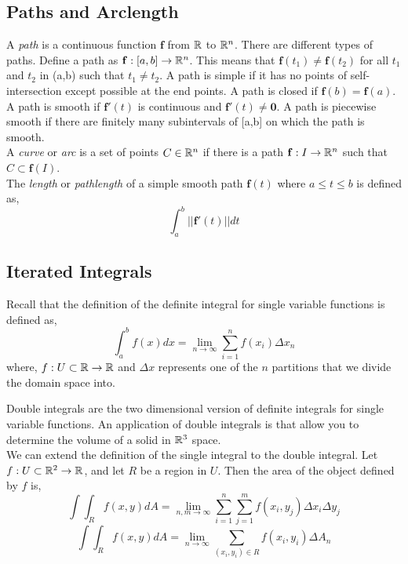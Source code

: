 \documentclass[12pt]{article}
\begin{document}
\subsection{Paths and Arclength}
 A \emph{path} is a continuous function $\mathbf{f}$ from $\mathbb{R}$ to $\mathbb{R}^n$. There are different types of paths. Define a path as $\mathbf{f}:[a,b]\rightarrow\mathbb{R}^n$. This means that $\mathbf{f}(t_1)\neq\mathbf{f}(t_2)$ for all $t_1$ and $t_2$ in (a,b) such that $t_1\neq t_2$. A path is simple if it has no points of self-intersection except possible at the end points. A path is closed if $\mathbf{f}(b)=\mathbf{f}(a)$. A path is smooth if $\mathbf{f}'(t)$ is continuous and $\mathbf{f}'(t)\neq\mathbf{0}$. A path is piecewise smooth if there are finitely many subintervals of [a,b] on which the path is smooth. \\

 A \emph{curve} or \emph{arc} is a set of points $C\in\mathbb{R}^n$ if there is a path $\mathbf{f}:I\rightarrow\mathbb{R}^n$ such that $C\subset\mathbf{f}(I)$. \\

 The \emph{length} or \emph{pathlength} of a simple smooth path $\mathbf{f}(t)$ where $a\leq t \leq b$ is defined as,
\[
\int_a^b || \mathbf{f}'(t) || dt
\]

\subsection{Iterated Integrals}

Recall that the definition of the definite integral for single variable functions is defined as,
\[
\int_a^b f(x) dx = \lim_{n\rightarrow\infty}\sum_{i=1}^n f(x_i)\Delta x_n
\]
where, $f:U\subset\mathbb{R}\rightarrow\mathbb{R}$ and $\Delta x$ represents one of the $n$ partitions that we divide the domain space into. 

 Double integrals are the two dimensional version of definite integrals for single variable functions. An application of double integrals is that allow you to determine the volume of a solid in $\mathbb{R}^3$ space.\\

 We can extend the definition of the single integral to the double integral. Let $f:U\subset\mathbb{R}^2\rightarrow\mathbb{R}$, and let $R$ be a region in $U$. Then the area of the object defined by $f$ is,
\[
\int\int_R f(x,y)dA = \lim_{n,m\rightarrow\infty}\sum_{i=1}^n\sum_{j=1}^m f(x_i,y_j)\Delta x_i \Delta y_j
\] 
\[
\int\int_R f(x,y)dA = \lim_{n \rightarrow \infty} \sum_{(x_i,y_i)\in R} f(x_i,y_i) \Delta A_n
\]
\end{document}
